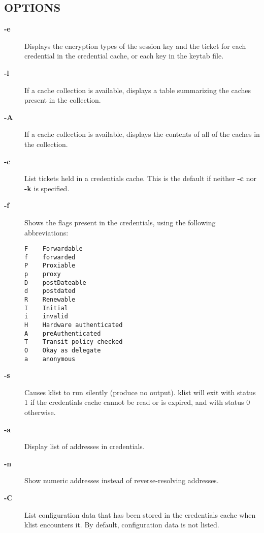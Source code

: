 \documentclass[letterpaper,10pt,english]{sphinxmanual}
\begin{document}
\subsection{OPTIONS}
\label{user/user_commands/klist:options}\begin{description}
\item[{\textbf{-e}}] \leavevmode
Displays the encryption types of the session key and the ticket
for each credential in the credential cache, or each key in the
keytab file.

\item[{\textbf{-l}}] \leavevmode
If a cache collection is available, displays a table summarizing
the caches present in the collection.

\item[{\textbf{-A}}] \leavevmode
If a cache collection is available, displays the contents of all
of the caches in the collection.

\item[{\textbf{-c}}] \leavevmode
List tickets held in a credentials cache. This is the default if
neither \textbf{-c} nor \textbf{-k} is specified.

\item[{\textbf{-f}}] \leavevmode
Shows the flags present in the credentials, using the following
abbreviations:

\begin{Verbatim}[commandchars=\\\{\}]
F    Forwardable
f    forwarded
P    Proxiable
p    proxy
D    postDateable
d    postdated
R    Renewable
I    Initial
i    invalid
H    Hardware authenticated
A    preAuthenticated
T    Transit policy checked
O    Okay as delegate
a    anonymous
\end{Verbatim}

\item[{\textbf{-s}}] \leavevmode
Causes klist to run silently (produce no output).  klist will exit
with status 1 if the credentials cache cannot be read or is
expired, and with status 0 otherwise.

\item[{\textbf{-a}}] \leavevmode
Display list of addresses in credentials.

\item[{\textbf{-n}}] \leavevmode
Show numeric addresses instead of reverse-resolving addresses.

\item[{\textbf{-C}}] \leavevmode
List configuration data that has been stored in the credentials
cache when klist encounters it.  By default, configuration data
is not listed.


\end{description}
\end{document}
